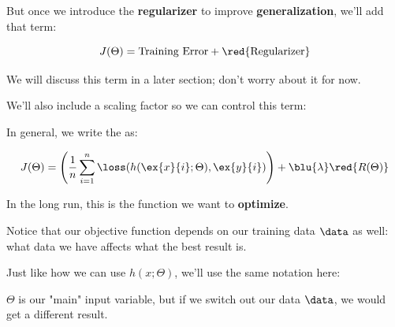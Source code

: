         
        
        But once we introduce the \textbf{regularizer}  to improve \textbf{generalization}, we'll add that term:
        
        \begin{equation*}
            J(\Theta) = \text{Training Error} + \red{\text{Regularizer}}
        \end{equation*}
        
        We will discuss this term in a later section; don't worry about it for now.
        
        We'll also include a scaling factor \blu{$\lambda$} so we can control this term:\\
        
        \begin{kequation}
            
            In general, we write the  as:
            
            \begin{equation*}
                J(\Theta) =
                \left( 
                \frac{1}{n}  \sum_{i=1}^n \loss ( h(\ex{x}{i}; \Theta), \ex{y}{i} ) 
                \right)
                +
                \blu{\lambda} \red{ R(\Theta)}
        \end{equation*}
        \end{kequation}
        
        
        In the long run, this is the function we want to \textbf{optimize}.
        
        Notice that our objective function depends on our training data $\data$ as well: what data we have affects what the best result is.
        
        Just like how we can use $h(x;\Theta)$, we'll use the same notation here: 
        
        $\Theta$ is our "main" input variable, but if we switch out our data $\data$, we would get a different result.\\
        
